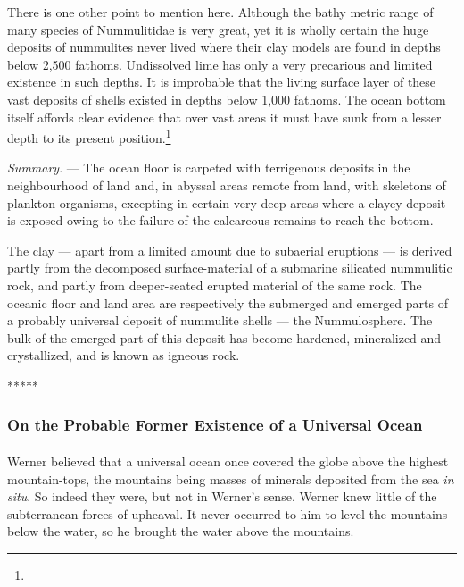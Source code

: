 \documentclass[a4paper, 12pt, oneside]{article}
\begin{document}
There is one other point to mention here. Although the bathy metric range of many species of Nummulitidae is very great, yet it is wholly certain the huge deposits of nummulites never lived where their clay models are found in depths below 2,500 fathoms. Undissolved lime has only a very precarious and limited existence in such depths. It is improbable that the living surface layer of these vast deposits of shells existed in depths below 1,000 fathoms. The ocean bottom itself affords clear evidence that over vast areas it must have sunk from a lesser depth to its present position.\footnote{}

\emph{Summary}. --- The ocean floor is carpeted with terrigenous deposits in the neighbourhood of land and, in abyssal areas remote from land, with skeletons of plankton organisms, excepting in certain very deep areas where a clayey deposit is exposed owing to the failure of the calcareous remains to reach the bottom.

The clay --- apart from a limited amount due to subaerial eruptions --- is derived partly from the decomposed surface-material of a submarine silicated nummulitic rock, and partly from deeper-seated erupted material of the same rock. The oceanic floor and land area are respectively the submerged and emerged parts of a probably universal deposit of nummulite shells --- the Nummulosphere. The bulk of the emerged part of this deposit has become hardened, mineralized and crystallized, and is known as igneous rock.

\centerline{*\hspace{15mm}*\hspace{15mm}*\hspace{15mm}*\hspace{15mm}*}
\bigskip
\subsubsection{On the Probable Former Existence of a Universal Ocean}
\paragraph{}
Werner believed that a universal ocean once covered the globe above the highest mountain-tops, the mountains being masses of minerals deposited from the sea \emph{in situ}. So indeed they were, but not in Werner's sense. Werner knew little of the subterranean forces of upheaval. It never occurred to him to level the mountains below the water, so he brought the water above the mountains.
\end{document}
